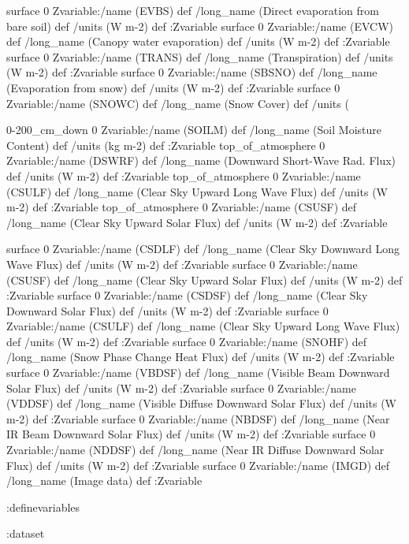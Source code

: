 \begin{ingrid}

surface 0 Zvariable:/name (EVBS) def /long_name (Direct evaporation from bare soil) def /units (W m-2) def :Zvariable
surface 0 Zvariable:/name (EVCW) def /long_name (Canopy water evaporation) def /units (W m-2) def :Zvariable
surface 0 Zvariable:/name (TRANS) def /long_name (Transpiration) def /units (W m-2) def :Zvariable
surface 0 Zvariable:/name (SBSNO) def /long_name (Evaporation from snow) def /units (W m-2) def :Zvariable
surface 0 Zvariable:/name (SNOWC) def /long_name (Snow Cover) def /units (%

\end{ingrid}
\begin{ingrid}

0-200_cm_down 0 Zvariable:/name (SOILM) def /long_name (Soil Moisture Content) def /units (kg m-2) def :Zvariable
top_of_atmosphere  0 Zvariable:/name (DSWRF)  def /long_name (Downward Short-Wave Rad. Flux) def /units (W m-2) def :Zvariable
top_of_atmosphere  0 Zvariable:/name (CSULF)  def /long_name (Clear Sky Upward Long Wave Flux) def /units (W m-2) def :Zvariable
top_of_atmosphere  0 Zvariable:/name (CSUSF)  def /long_name (Clear Sky Upward Solar Flux) def /units (W m-2) def :Zvariable

\end{ingrid}
\begin{ingrid}

surface  0 Zvariable:/name (CSDLF)  def /long_name (Clear Sky Downward Long Wave Flux) def /units (W m-2) def :Zvariable
surface  0 Zvariable:/name (CSUSF)  def /long_name (Clear Sky Upward Solar Flux) def /units (W m-2) def :Zvariable
surface  0 Zvariable:/name (CSDSF)  def /long_name (Clear Sky Downward Solar Flux) def /units (W m-2) def :Zvariable
surface  0 Zvariable:/name (CSULF)  def /long_name (Clear Sky Upward Long Wave Flux) def /units (W m-2) def :Zvariable
surface  0 Zvariable:/name (SNOHF)  def /long_name (Snow Phase Change Heat Flux) def /units (W m-2) def :Zvariable
surface  0 Zvariable:/name (VBDSF)  def /long_name (Visible Beam Downward Solar Flux) def /units (W m-2) def :Zvariable
surface  0 Zvariable:/name (VDDSF)  def /long_name (Visible Diffuse Downward Solar Flux) def /units (W m-2) def :Zvariable
surface  0 Zvariable:/name (NBDSF)  def /long_name (Near IR Beam Downward Solar Flux) def /units (W m-2) def :Zvariable
surface  0 Zvariable:/name (NDDSF)  def /long_name (Near IR Diffuse Downward Solar Flux) def /units (W m-2) def :Zvariable
surface  0 Zvariable:/name (IMGD)  def /long_name (Image data) def :Zvariable

:definevariables

:dataset
\end{ingrid}
